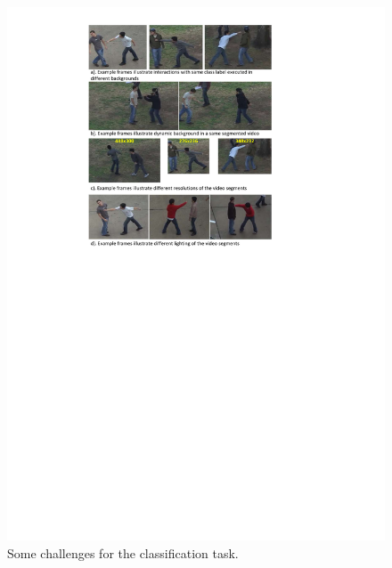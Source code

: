\begin{figure}
	\includegraphics[trim=2cm 16.5cm 0cm 1cm]{figs/ut_challenges_1.pdf}
	\caption{Some challenges for the classification task. }
	\label{fig:ut_challenges_1}
\end{figure}

